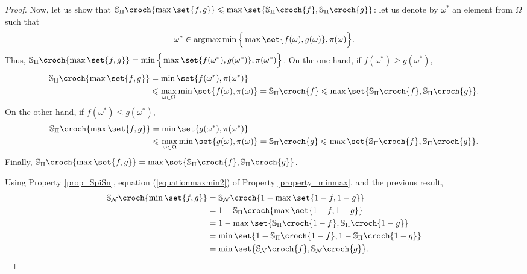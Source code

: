 \begin{proof}
Now, let us show that $\mathbb{S}_{\Pi}\croch{\max \set{f,g}} \leqslant \max \set{\mathbb{S}_{\Pi}\croch{f}, \mathbb{S}_{\Pi}\croch{g} }$:
let us denote by $\omega^*$ an element from $\Omega$ such that 
\[ \omega^* \in \operatorname*{argmax} \min \Big\{ \max \set{ f(\omega), g(\omega) }, \pi(\omega) \Big\}. \]
Thus, $\mathbb{S}_{\Pi}\croch{ \max \set{f, g} }= \min \Big\{ \max \set{ f(\omega^*), g(\omega^*) }, \pi(\omega^*) \Big\}$.
On the one hand, if $f(\omega^*) \geqslant g(\omega^*)$,
\begin{align*}
\mathbb{S}_{\Pi} \croch{\max \set{f,g} } &= \min \set{ f(\omega^*), \pi(\omega^*) } \\
& \leqslant \max_{\omega \in \Omega} \min \set{ f(\omega), \pi(\omega) } = \mathbb{S}_{\Pi} \croch{ f } \leqslant \max \set{ \mathbb{S}_{\Pi} \croch{ f }, \mathbb{S}_{\Pi} \croch{ g }  }. 
\end{align*}
On the other hand, if $f(\omega^*) \leqslant g(\omega^*)$,
\begin{align*}
\mathbb{S}_{\Pi} \croch{\max \set{f,g} } &= \min \set{ g(\omega^*), \pi(\omega^*) } \\
& \leqslant \max_{\omega \in \Omega} \min \set{ g(\omega), \pi(\omega) } = \mathbb{S}_{\Pi} \croch{ g } \leqslant \max \set{ \mathbb{S}_{\Pi} \croch{ f }, \mathbb{S}_{\Pi} \croch{ g }  }. 
\end{align*}
Finally, $\mathbb{S}_{\Pi} \croch{ \max \set{ f,g } } = \max \set{\mathbb{S}_{\Pi} \croch{f}, \mathbb{S}_{\Pi} \croch{g} }$.

Using Property \ref{prop_SpiSn}, equation (\ref{equationmaxmin2}) of Property \ref{property_minmax},
and the previous result,
\begin{align*}
\mathbb{S}_{\mathcal{N}}\croch{ \min \set{f,g} } &= \mathbb{S}_{\mathcal{N}} \croch{ 1 - \max \set{ 1-f,1-g } } \\
&= 1 -\mathbb{S}_{\Pi} \croch{ \max \set{ 1 - f, 1 - g } } \\
&= 1 - \max \set{ \mathbb{S}_{\Pi} \croch{ 1 - f }, \mathbb{S}_{\Pi} \croch{ 1-g }  } \\
&= \min \set{ 1 - \mathbb{S}_{\Pi} \croch{ 1 - f }, 1 -\mathbb{S}_{\Pi} \croch{ 1-g } }\\
&= \min \set{ \mathbb{S}_{\mathcal{N}} \croch{f}, \mathbb{S}_{\mathcal{N}} \croch{g} }.
\end{align*}
\end{proof}	

